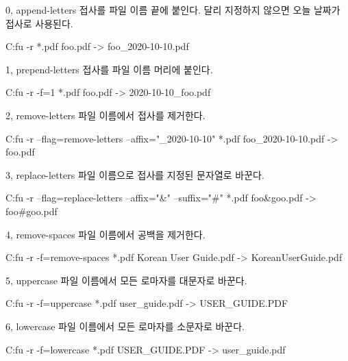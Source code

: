 \begin{macros}
\item[0, append-letters] 접사를 파일 이름 끝에 붙인다. 달리 지정하지 않으면 오늘 날짜가 접사로 사용된다.

\begin{code}
C:\>fu -r *.pdf
foo.pdf -> foo_2020-10-10.pdf
\end{code}

\item[1, prepend-letters] 접사를 파일 이름 머리에 붙인다. 

\begin{code} 
C:\>fu -r -f=1 *.pdf
foo.pdf -> 2020-10-10_foo.pdf
\end{code}

\item[2, remove-letters] 파일 이름에서 접사를 제거한다. 

\begin{code} 
C:\>fu -r --flag=remove-letters --affix="_2020-10-10" *.pdf
foo_2020-10-10.pdf -> foo.pdf
\end{code}

\item[3, replace-letters] 파일 이름으로 접사를 지정된 문자열로 바꾼다.

\begin{code} 
C:\>fu -r --flag=replace-letters --affix="&" --suffix="#" *.pdf
foo&goo.pdf -> foo#goo.pdf
\end{code}

\item[4, remove-spaces] 파일 이름에서 공백을 제거한다.

\begin{code} 
C:\>fu -r -f=remove-spaces *.pdf
Korean User Guide.pdf -> KoreanUserGuide.pdf
\end{code}

\item[5, uppercase] 파일 이름에서 모든 로마자를 대문자로 바꾼다.

\begin{code} 
C:\>fu -r -f=uppercase *.pdf
user_guide.pdf -> USER_GUIDE.PDF
\end{code}

\item[6, lowercase] 파일 이름에서 모든 로마자를 소문자로 바꾼다.

\begin{code} 
C:\>fu -r -f=lowercase *.pdf
USER_GUIDE.PDF -> user_guide.pdf 
\end{code}


\end{macros}
